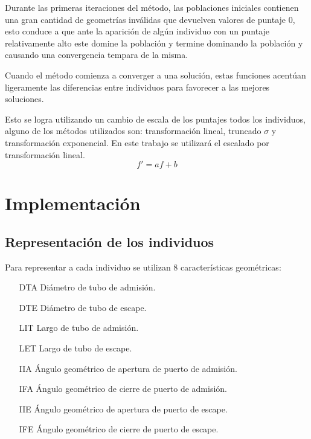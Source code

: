 Durante las primeras iteraciones del método, las poblaciones iniciales
contienen una gran cantidad de geometrías inválidas que devuelven valores de
puntaje 0, esto conduce a que ante la aparición de algún individuo con un
puntaje relativamente alto este domine la población y termine dominando la
población y causando una convergencia tempara de la misma.

Cuando el método comienza a converger a una solución, estas funciones acentúan
ligeramente las diferencias entre individuos para favorecer a las mejores
soluciones.

Esto se logra utilizando un cambio de escala de los puntajes todos los
individuos, alguno de los métodos utilizados son: transformación lineal,
truncado $\sigma$ y transformación exponencial.
%
En este trabajo se utilizará el escalado por transformación lineal.
\begin{equation}
    f' = af + b
\end{equation}

\section{Implementación}
%
\subsection{Representación de los individuos}
%
Para representar a cada individuo se utilizan 8 características geométricas:

\begin{enumerate}
    \item [DTA] Diámetro de tubo de admisión.
    \item [DTE] Diámetro de tubo de escape.
    \item [LIT] Largo de tubo de admisión.
    \item [LET] Largo de tubo de escape.
    \item [IIA] Ángulo geométrico de apertura de puerto de admisión.
    \item [IFA] Ángulo geométrico de cierre de puerto de admisión.
    \item [IIE] Ángulo geométrico de apertura de puerto de escape.
    \item [IFE] Ángulo geométrico de cierre de puerto de escape.
\end{enumerate}



